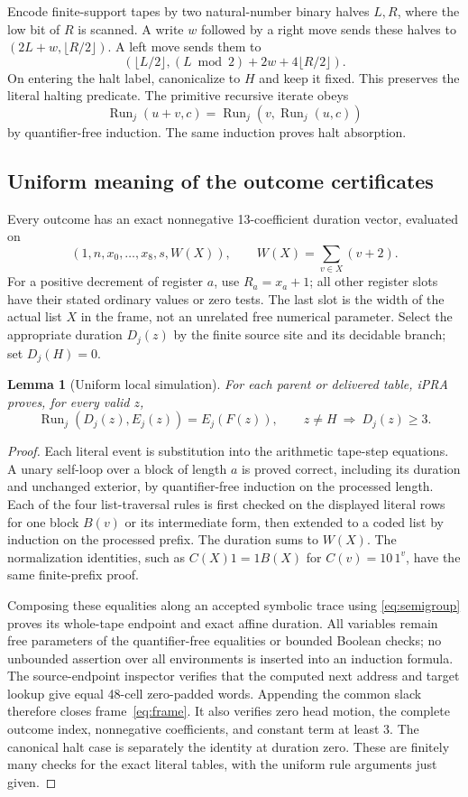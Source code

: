 \documentclass[11pt]{article}
\newtheorem{lemma}[theorem]{Lemma}
\newcommand{\Run}{\operatorname{Run}}
\begin{document}
Encode finite-support tapes by two natural-number binary halves $L,R$,
where the low bit of $R$ is scanned. A write $w$ followed by a right
move sends these halves to $(2L+w,\lfloor R/2\rfloor)$. A left move
sends them to
\[
 (\lfloor L/2\rfloor,
    (L\bmod2)+2w+4\lfloor R/2\rfloor).
\]
On entering the halt label, canonicalize to $H$ and keep it fixed.
This preserves the literal halting predicate. The primitive recursive
iterate obeys
\[
 \Run_j(u+v,c)=\Run_j(v,\Run_j(u,c))
 \tag{2}\label{eq:semigroup}
\]
by quantifier-free induction. The same induction proves halt absorption.

\subsection{Uniform meaning of the outcome certificates}

Every outcome has an exact nonnegative 13-coefficient duration vector,
evaluated on
\[
 (1,n,x_0,\ldots,x_8,s,W(X)),\qquad
 W(X)=\sum_{v\in X}(v+2).
 \tag{3}\label{eq:valuation}
\]
For a positive decrement of register $a$, use $R_a=x_a+1$; all
other register slots have their stated ordinary values or zero tests.
The last slot is the width of the actual list $X$ in the frame,
not an unrelated free numerical parameter. Select the appropriate
duration $D_j(z)$ by the finite source site and its decidable branch;
set $D_j(H)=0$.

\begin{lemma}[Uniform local simulation]
For each parent or delivered table, iPRA proves, for every valid $z$,
\[
 \Run_j(D_j(z),E_j(z))=E_j(F(z)),
 \qquad z\ne H\ \Longrightarrow\ D_j(z)\ge3.
 \tag{4}\label{eq:local}
\]
\end{lemma}
\begin{proof}
Each literal event is substitution into the arithmetic tape-step
equations. A unary self-loop over a block of length $a$ is proved
correct, including its duration and unchanged exterior, by
quantifier-free induction on the processed length. Each of the four
list-traversal rules is first checked on the displayed literal rows
for one block $B(v)$ or its intermediate form, then extended to a
coded list by induction on the processed prefix. The duration sums
to $W(X)$. The normalization identities, such as
$C(X)1=1B(X)$ for $C(v)=10\,1^v$, have the same finite-prefix proof.

Composing these equalities along an accepted symbolic trace using
\eqref{eq:semigroup} proves its whole-tape endpoint and exact affine
duration. All variables remain free parameters of the quantifier-free
equalities or bounded Boolean checks; no unbounded assertion over all
environments is inserted into an induction formula. The source-endpoint
inspector verifies that the computed next address and target lookup
give equal 48-cell zero-padded words. Appending the common slack
therefore closes frame~\eqref{eq:frame}. It also verifies zero head
motion, the complete outcome index, nonnegative coefficients, and
constant term at least 3. The canonical halt case is separately the
identity at duration zero. These are finitely many checks for the
exact literal tables, with the uniform rule arguments just given.
\end{proof}
\end{document}
